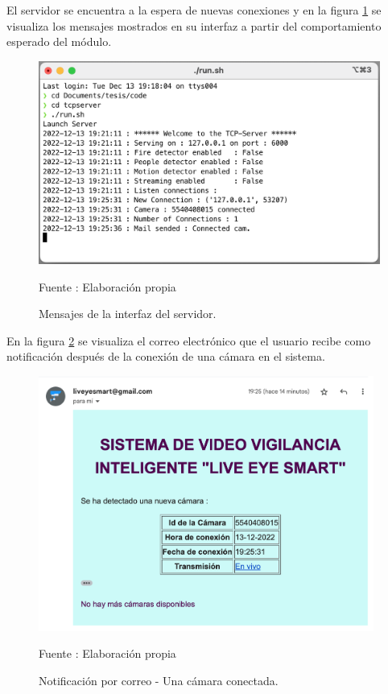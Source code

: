 El servidor se encuentra a la espera de nuevas conexiones y en la figura \ref{camera_connected_one_camera} se visualiza los mensajes mostrados en su interfaz a partir del comportamiento esperado del módulo.\\

\begin{figure}[H]
    \begin{center}
        \includegraphics[width=13cm]{img/capitulo_6/server_cam_connected.png}
    \end{center}
    \begin{center}
        \caption{Mensajes de la interfaz del servidor.}
        Fuente : Elaboración propia
        \label{camera_connected_one_camera}
    \end{center}
\end{figure}

En la figura \ref{mail_one_camera_connected} se visualiza el correo electrónico que el usuario recibe como notificación después de la conexión de una cámara en el sistema.\\

\begin{figure}[H]
    \begin{center}
        \includegraphics[width=11cm]{img/capitulo_6/mail1.png}
    \end{center}
    \begin{center}
        \caption{Notificación por correo - Una cámara conectada.}
        Fuente : Elaboración propia
        \label{mail_one_camera_connected}
    \end{center}
\end{figure}

